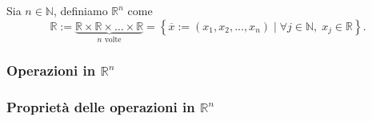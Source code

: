 Sia $n\in\mathbb{N}$, definiamo $\mathbb{R}^n$ come \[\mathbb{R} := \underbrace{\mathbb{R}\times
\mathbb{R}\times \dots \times\mathbb{R}}_{n \text{ volte}} = \left\{\overline{x}:=\left(x_1,
x_2, \ldots , x_n\right)\mid \forall j\in\mathbb{N},\;x_j\in\mathbb{R}\right\}.\]

\subsubsection{Operazioni in $\mathbb{R}^n$}



\subsubsection{Proprietà delle operazioni in $\mathbb{R}^n$}

